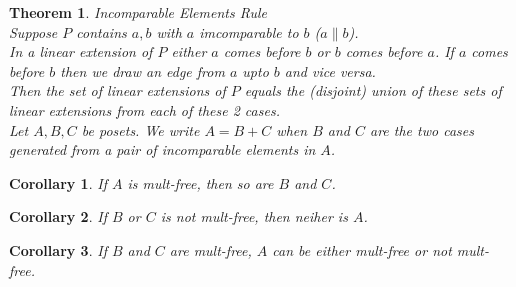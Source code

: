 \documentclass[reqno]{amsart}
\newtheorem{theorem}{Theorem}
\newtheorem{corollary}{Corollary}[theorem]
\begin{document}
\begin{theorem}
\textit{Incomparable Elements Rule}\\
Suppose $P$ contains $a,b$ with $a$ imcomparable to $b$ ($a \| b$).\\
In a linear extension of $P$ either $a$ comes before $b$ or $b$ comes before $a$. If $a$ comes before $b$ then we draw an edge from $a$ upto $b$ and vice versa.\\
Then the set of linear extensions of $P$ equals the (disjoint) union of these sets of linear extensions from each of these 2 cases.\\

\vspace{0.1in}
Let $A,B,C$ be posets. We write $A = B + C$ when $B$ and $C$ are the two cases generated from a pair of incomparable elements in $A$.\\
\end{theorem}

\begin{corollary}
If $A$ is mult-free, then so are $B$ and $C$.
\end{corollary}

\begin{corollary}
If $B$ or $C$ is not mult-free, then neiher is $A$.
\end{corollary}

\begin{corollary}
If $B$ and $C$ are mult-free, $A$ can be either mult-free or not mult-free.
\end{corollary}
\end{document}
